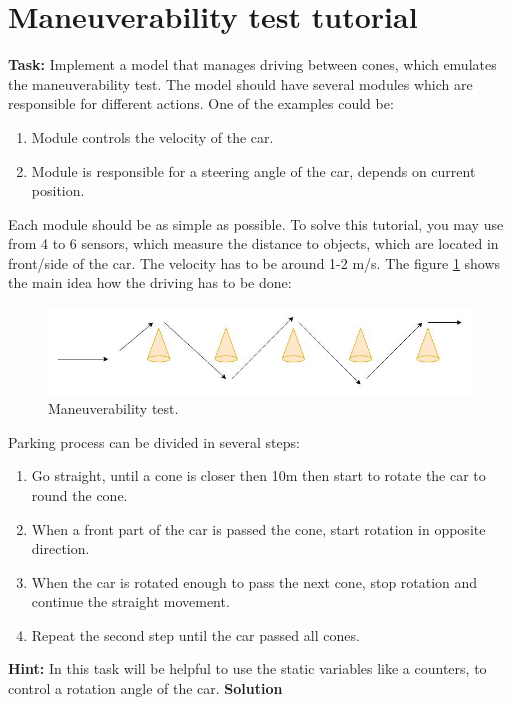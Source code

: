 \section{Maneuverability test tutorial}
\textbf{Task:} Implement a model that manages driving between cones, which emulates the maneuverability test. The model should have several modules which are responsible for different actions. One of the examples could be:
\begin{enumerate}
    \item Module controls the velocity of the car.
    \item Module is responsible for a steering angle of the car, depends on current position.
\end{enumerate}
Each module should be as simple as possible.
To solve this tutorial, you may use from 4 to 6 sensors, which measure the distance to objects, which are located in front/side of the car. The velocity has to be around 1-2 m/s. The figure \ref{fig:maneuverability} shows the main idea how the driving has to be done:
\begin{figure}[h!]
    \centering
    \includegraphics[width=\linewidth]{src/pic/drive_cones}
    \caption{Maneuverability test.}
    \label{fig:maneuverability}
\end{figure} \newpage
Parking process can be divided in several steps:
\begin{enumerate}
    \item Go straight, until a cone is closer then 10m then start to rotate the car to round the cone.
    \item When a front part of the car is passed the cone, start rotation in opposite direction.
    \item When the car is rotated enough to pass the next cone, stop rotation and continue the straight movement.
    \item Repeat the second step until the car passed all cones.
\end{enumerate}
\textbf{Hint:} In this task will be helpful to use the static variables like a counters, to control a rotation angle of the car. \newline \newline
\textbf{Solution} \newline \newline
